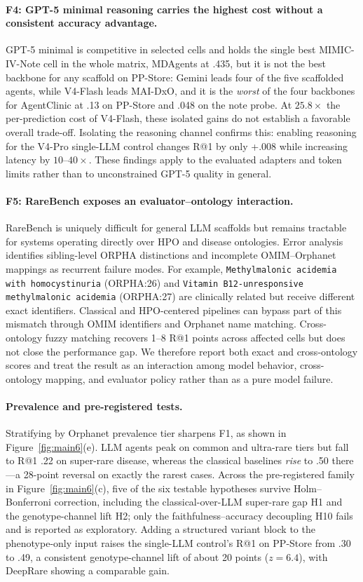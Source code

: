 \paragraph{F4: GPT-5 minimal reasoning carries the highest cost without a consistent accuracy advantage.}
GPT-5 minimal is competitive in selected cells and holds the single best MIMIC-IV-Note cell in the whole matrix, MDAgents at .435, but it is not the best backbone for any scaffold on PP-Store: Gemini leads four of the five scaffolded agents, while V4-Flash leads MAI-DxO, and it is the \emph{worst} of the four backbones for AgentClinic at .13 on PP-Store and .048 on the note probe. At $25.8\times$ the per-prediction cost of V4-Flash, these isolated gains do not establish a favorable overall trade-off. Isolating the reasoning channel confirms this: enabling reasoning for the V4-Pro single-LLM control changes R@1 by only +.008 while increasing latency by $10$--$40\times$. These findings apply to the evaluated adapters and token limits rather than to unconstrained GPT-5 quality in general.

\paragraph{F5: RareBench exposes an evaluator--ontology interaction.}
RareBench is uniquely difficult for general LLM scaffolds but remains tractable for systems operating directly over HPO and disease ontologies. Error analysis identifies sibling-level ORPHA distinctions and incomplete OMIM--Orphanet mappings as recurrent failure modes. For example, \texttt{Methylmalonic acidemia with homocystinuria} (ORPHA:26) and \texttt{Vitamin B12-unresponsive methylmalonic acidemia} (ORPHA:27) are clinically related but receive different exact identifiers. Classical and HPO-centered pipelines can bypass part of this mismatch through OMIM identifiers and Orphanet name matching. Cross-ontology fuzzy matching recovers 1--8 R@1 points across affected cells but does not close the performance gap. We therefore report both exact and cross-ontology scores and treat the result as an interaction among model behavior, cross-ontology mapping, and evaluator policy rather than as a pure model failure.

\paragraph{Prevalence and pre-registered tests.}
Stratifying by Orphanet prevalence tier sharpens F1, as shown in Figure~\ref{fig:main6}(e). LLM agents peak on common and ultra-rare tiers but fall to R@1 .22 on super-rare disease, whereas the classical baselines \emph{rise} to .50 there---a 28-point reversal on exactly the rarest cases. Across the pre-registered family in Figure~\ref{fig:main6}(c), five of the six testable hypotheses survive Holm--Bonferroni correction, including the classical-over-LLM super-rare gap H1 and the genotype-channel lift H2; only the faithfulness--accuracy decoupling H10 fails and is reported as exploratory. Adding a structured variant block to the phenotype-only input raises the single-LLM control's R@1 on PP-Store from .30 to .49, a consistent genotype-channel lift of about 20 points ($z=6.4$), with DeepRare showing a comparable gain.


